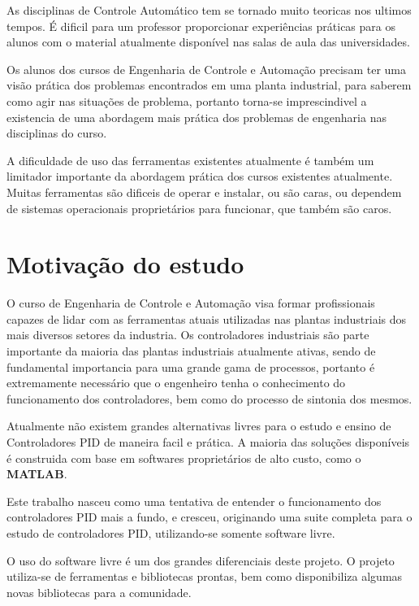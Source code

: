     As disciplinas de Controle Automático tem se tornado muito teoricas nos ultimos
    tempos. É dificil para um professor proporcionar experiências práticas para os
    alunos com o material atualmente disponível nas salas de aula das universidades.

    Os alunos dos cursos de Engenharia de Controle e Automação precisam ter uma
    visão prática dos problemas encontrados em uma planta industrial, para saberem
    como agir nas situações de problema, portanto torna-se imprescindivel a existencia
    de uma abordagem mais prática dos problemas de engenharia nas disciplinas do curso.

    A dificuldade de uso das ferramentas existentes atualmente é também um limitador
    importante da abordagem prática dos cursos existentes atualmente. Muitas ferramentas
    são dificeis de operar e instalar, ou são caras, ou dependem de sistemas operacionais
    proprietários para funcionar, que também são caros.

\section{Motivação do estudo}

    O curso de Engenharia de Controle e Automação visa formar profissionais
    capazes de lidar com as ferramentas atuais utilizadas nas plantas industriais
    dos mais diversos setores da industria. Os controladores industriais são
    parte importante da maioria das plantas industriais atualmente ativas,
    sendo de fundamental importancia para uma grande gama de processos, portanto
    é extremamente necessário que o engenheiro tenha o conhecimento do funcionamento
    dos controladores, bem como do processo de sintonia dos mesmos.
    
    Atualmente não existem grandes alternativas livres para o estudo e ensino
    de Controladores PID de maneira facil e prática. A maioria das soluções
    disponíveis é construida com base em softwares proprietários de alto custo,
    como o \textbf{MATLAB}.
    
    Este trabalho nasceu como uma tentativa de entender o funcionamento dos
    controladores PID mais a fundo, e cresceu, originando uma suite completa
    para o estudo de controladores PID, utilizando-se somente software livre.

    O uso do software livre é um dos grandes diferenciais deste projeto. O projeto
    utiliza-se de ferramentas e bibliotecas prontas, bem como disponibiliza algumas
    novas bibliotecas para a comunidade.

